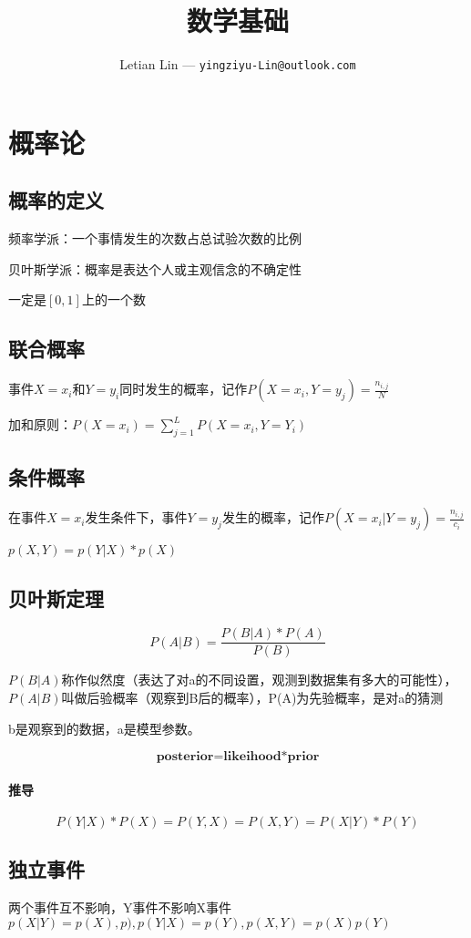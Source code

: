 \documentclass[UTF8]{ctexart}
\title{
	数学基础
}
\author{
	Letian Lin --- \texttt{yingziyu-Lin@outlook.com}
}
\begin{document}
\maketitle
\section{概率论}
\subsection{概率的定义}
频率学派：一个事情发生的次数占总试验次数的比例

贝叶斯学派：概率是表达个人或主观信念的不确定性

一定是$[0,1]$上的一个数

\subsection{联合概率}
事件$X=x_i$和$Y=y_i$同时发生的概率，记作$P(X=x_i,Y=y_j) = \frac{n_{i,j}}{N}$

加和原则：$P(X=x_i)=\sum^L_{j=1}P(X=x_i,Y=Y_i)$

\subsection{条件概率}
在事件$X=x_i$发生条件下，事件$Y=y_j$发生的概率，记作$P(X=x_i|Y=y_j)=\frac{n_{i,j}}{c_i}$

$p(X,Y)=p(Y|X)*p(X)$

\subsection{贝叶斯定理}
$$P(A|B)=\frac{P(B|A)*P(A)}{P(B)}$$

$P(B|A)$称作似然度（表达了对a的不同设置，观测到数据集有多大的可能性），$P(A|B)$叫做后验概率（观察到B后的概率），P(A)为先验概率，是对a的猜测

b是观察到的数据，a是模型参数。

$$\textbf{posterior=likeihood*prior}$$

\paragraph{推导}
$$P(Y|X)*P(X)=P(Y,X)=P(X,Y)=P(X|Y)*P(Y)$$

\subsection{独立事件}
两个事件互不影响，Y事件不影响X事件$p(X|Y)=p(X),p),p(Y|X)=p(Y),p(X,Y)=p(X)p(Y)$
\end{document}
